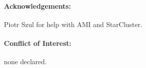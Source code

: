 \documentclass{bioinfo}
\begin{document}

\paragraph{Acknowledgements:}
Piotr Szul for  help with AMI and StarCluster.

\paragraph{Conflict of Interest:} none declared.


\end{document}
